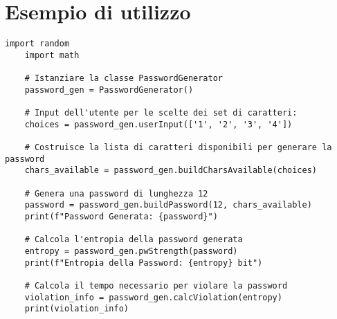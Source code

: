 \documentclass{article}
\begin{document}
    \section*{Esempio di utilizzo}
        \begin{lstlisting}[style=smallcode]
    import random
    import math

    # Istanziare la classe PasswordGenerator
    password_gen = PasswordGenerator()

    # Input dell'utente per le scelte dei set di caratteri:
    choices = password_gen.userInput(['1', '2', '3', '4'])

    # Costruisce la lista di caratteri disponibili per generare la password
    chars_available = password_gen.buildCharsAvailable(choices)

    # Genera una password di lunghezza 12
    password = password_gen.buildPassword(12, chars_available)
    print(f"Password Generata: {password}")

    # Calcola l'entropia della password generata
    entropy = password_gen.pwStrength(password)
    print(f"Entropia della Password: {entropy} bit")

    # Calcola il tempo necessario per violare la password
    violation_info = password_gen.calcViolation(entropy)
    print(violation_info)
        \end{lstlisting}
\end{document}

